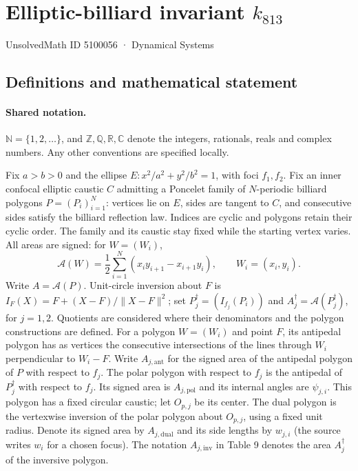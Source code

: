 \documentclass[11pt]{article}
\begin{document}
\setcounter{section}{5100055}
\section{Elliptic-billiard invariant $k_{813}$}\label{5100056}
{\small\sffamily UnsolvedMath ID 5100056 · Dynamical Systems}
\subsection{Definitions and mathematical statement}

\paragraph{Shared notation.}$\mathbb N=\{1,2,\ldots\}$, and $\mathbb Z,\mathbb Q,\mathbb R,\mathbb C$ denote the integers, rationals, reals and complex numbers. Any other conventions are specified locally.


Fix $a>b>0$ and the ellipse $E:x^2/a^2+y^2/b^2=1$, with foci $f_1,f_2$. Fix an inner confocal elliptic caustic $C$ admitting a Poncelet family of $N$-periodic billiard polygons $P=(P_i)_{i=1}^N$: vertices lie on $E$, sides are tangent to $C$, and consecutive sides satisfy the billiard reflection law. Indices are cyclic and polygons retain their cyclic order. The family and its caustic stay fixed while the starting vertex varies. All areas are signed: for $W=(W_i)$,
\[\mathcal A(W)=\frac12\sum_{i=1}^N(x_i y_{i+1}-x_{i+1}y_i),\qquad W_i=(x_i,y_i).\]
Write $A=\mathcal A(P)$. Unit-circle inversion about $F$ is $I_F(X)=F+(X-F)/\lVert X-F\rVert^2$; set $P_j^\dagger=(I_{f_j}(P_i))$ and $A_j^\dagger=\mathcal A(P_j^\dagger)$, for $j=1,2$. Quotients are considered where their denominators and the polygon constructions are defined. For a polygon $W=(W_i)$ and point $F$, its antipedal polygon has as vertices the consecutive intersections of the lines through $W_i$ perpendicular to $W_i-F$. Write $A_{j,\mathrm{ant}}$ for the signed area of the antipedal polygon of $P$ with respect to $f_j$. The polar polygon with respect to $f_j$ is the antipedal of $P_j^\dagger$ with respect to $f_j$. Its signed area is $A_{j,\mathrm{pol}}$ and its internal angles are $\psi_{j,i}$. This polygon has a fixed circular caustic; let $O_{p,j}$ be its center. The dual polygon is the vertexwise inversion of the polar polygon about $O_{p,j}$, using a fixed unit radius. Denote its signed area by $A_{j,\mathrm{dual}}$ and its side lengths by $w_{j,i}$ (the source writes $w_i$ for a chosen focus). The notation $A_{j,\mathrm{inv}}$ in Table 9 denotes the area $A_j^\dagger$ of the inversive polygon.
\end{document}
